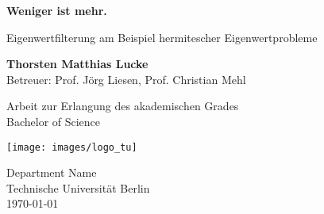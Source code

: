 \begin{titlepage}
  \begin{center}
    \vspace*{1cm}

    \Huge
    \textbf{\glqq Weniger ist mehr.\grqq}

    \vspace{0.5cm}
    \LARGE
    Eigenwertfilterung am Beispiel hermitescher Eigenwertprobleme

    \vspace{1.5cm}

    \textbf{Thorsten Matthias Lucke}\\
    Betreuer: Prof. Jörg Liesen, Prof. Christian Mehl

    \vfill

    Arbeit zur Erlangung des akademischen Grades\\
    Bachelor of Science

    \vspace{0.8cm}

    \texttt{[image: images/logo\_tu]}

    \Large
    Department Name\\
    Technische Universität Berlin\\
    \today

  \end{center}
\end{titlepage}
